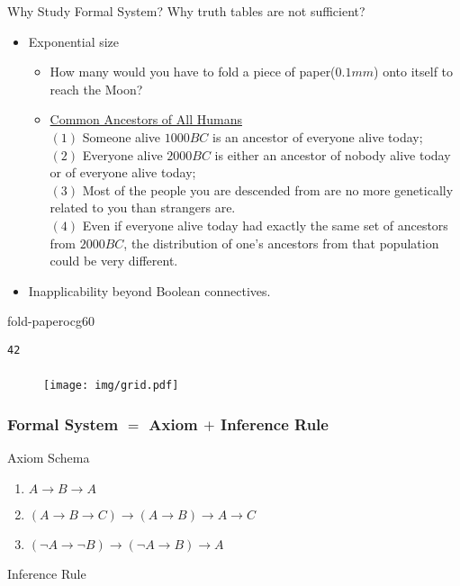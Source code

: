 \documentclass[UTF8,11pt,colorlinks,compress,openany]{beamer}%
\begin{document}
\begin{frame}[fragile]{Why Study Formal System?}
	Why truth tables are not sufficient?
	\begin{itemize}
		\item Exponential size
		\begin{itemize}
			\item How many  would you have to fold a piece of paper($0.1mm$) onto itself to reach the Moon?
			\item \href{http://nautil.us/blog/we-are-all-princes-paupers-and-part-of-the-human-family}{Common Ancestors of All Humans}\\
			$(1)$ Someone alive $1000BC$ is an ancestor of everyone alive today;\\
			$(2)$ Everyone alive $2000BC$ is either an ancestor of nobody alive today or of everyone alive today;\\
			$(3)$ Most of the people you are descended from are no more genetically related to you than strangers are.\\
			$(4)$ Even if everyone alive today had exactly the same set of ancestors from $2000BC$, the distribution of one's ancestors from that population could be very different.
		\end{itemize}
		\item Inapplicability beyond Boolean connectives.
	\end{itemize}
\begin{ocg}{fold-paper}{ocg6}{0}
\begin{verbatim}
42
\end{verbatim}
\end{ocg}
\end{frame}

\begin{frame}\frametitle{}\vspace*{-21pt}
\begin{figure}[H]
	\texttt{[image: img/grid.pdf]}
\end{figure}
\end{frame}

\begin{frame}\frametitle{Formal System $=$ Axiom $+$ Inference Rule}
		\begin{block}{Axiom Schema}
			\begin{enumerate}
				\item $A\to B\to A$
				\item $(A\to B\to C)\to(A\to B)\to A\to C$
				\item $(\neg A\to\neg B)\to(\neg A\to B)\to A$
			\end{enumerate}
		\end{block}
		\begin{block}{Inference Rule}
			\begin{prooftree}
				\alwaysSingleLine
				\RightLabel{\textcolor{yellow}{[MP]}}
			\end{prooftree}
		\end{block}
\end{frame}
\end{document}
